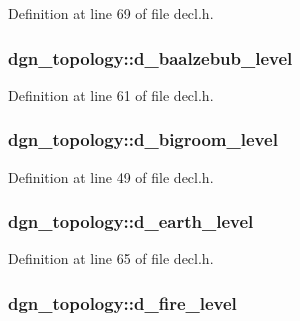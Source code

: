 Definition at line 69 of file decl.\+h.

\hypertarget{structdgn__topology_a1cd535a31083cd1f46106388142bcc34}{
\subsubsection[{d\+\_\+baalzebub\+\_\+level}]{ dgn\+\_\+topology\+::d\+\_\+baalzebub\+\_\+level}}\label{structdgn__topology_a1cd535a31083cd1f46106388142bcc34}


Definition at line 61 of file decl.\+h.

\hypertarget{structdgn__topology_a4a1651865b98a8a8884bfb419fd408fc}{
\subsubsection[{d\+\_\+bigroom\+\_\+level}]{ dgn\+\_\+topology\+::d\+\_\+bigroom\+\_\+level}}\label{structdgn__topology_a4a1651865b98a8a8884bfb419fd408fc}


Definition at line 49 of file decl.\+h.

\hypertarget{structdgn__topology_a107477714cf5900cf9abbf8794fdf0ea}{
\subsubsection[{d\+\_\+earth\+\_\+level}]{ dgn\+\_\+topology\+::d\+\_\+earth\+\_\+level}}\label{structdgn__topology_a107477714cf5900cf9abbf8794fdf0ea}


Definition at line 65 of file decl.\+h.

\hypertarget{structdgn__topology_ab76f8bace6e620cfaf104d12c5ae869a}{
\subsubsection[{d\+\_\+fire\+\_\+level}]{ dgn\+\_\+topology\+::d\+\_\+fire\+\_\+level}}\label{structdgn__topology_ab76f8bace6e620cfaf104d12c5ae869a}


